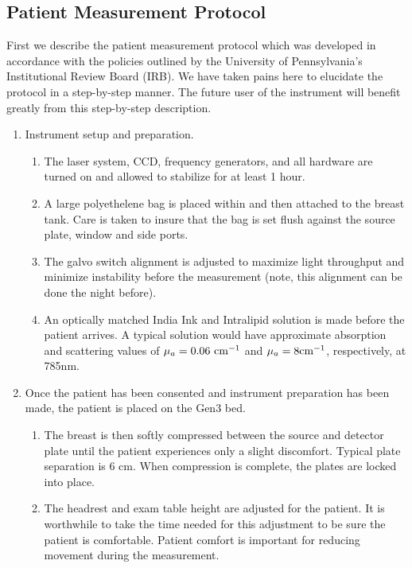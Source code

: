 \subsection{Patient Measurement Protocol}
First we describe the patient measurement protocol which was developed in accordance with the policies outlined by the University of Pennsylvania's Institutional Review Board (IRB). We have taken pains here to elucidate the protocol in a step-by-step manner. The future user of the instrument will benefit greatly from this step-by-step description.
\label{sec:protocol}
\begin{enumerate}[noitemsep]
\item Instrument setup and preparation.
\vspace{-2mm}
    \begin{enumerate}[noitemsep]
    \item The laser system, CCD, frequency generators, and all hardware are turned on and allowed to stabilize for at least 1 hour.
    \item A large polyethelene bag is placed within and then attached to the breast tank. Care is taken to insure that the bag is set flush against the source plate, window and side ports.
    \item The galvo switch alignment is adjusted to maximize light throughput and minimize instability before the measurement (note, this alignment can be done the night before).
    \item An optically matched India Ink and Intralipid solution is made before the patient arrives. A typical solution would have approximate absorption and scattering values of $\mu_a=0.06~\rm{cm}^{-1}$ and $\mu_a=8\rm{cm}^{-1}$, respectively, at 785nm.
    \end{enumerate}
\item Once the patient has been consented and instrument preparation has been made, the patient is placed on the Gen3 bed.
\vspace{-2mm}
    \begin{enumerate}[noitemsep]
    \item The breast is then softly compressed between the source and detector plate until the patient experiences only a slight discomfort. Typical plate separation is $6$ cm. When compression is complete, the plates are locked into place.
    \item The headrest and exam table height are adjusted for the patient. It is worthwhile to take the time needed for this adjustment to be sure the patient is comfortable. Patient comfort is important for reducing movement during the measurement.

\end{enumerate}
\end{enumerate}
